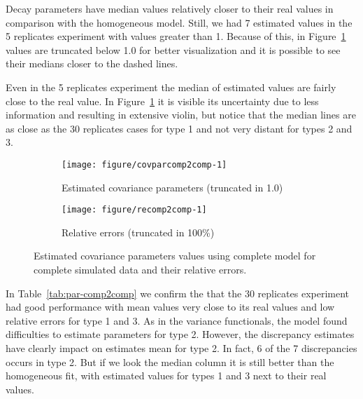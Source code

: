 Decay parameters have median values relatively closer to their real values in comparison with the homogeneous model. Still, we had 7 estimated values in the 5 replicates experiment with values greater than 1. Because of this, in Figure~\ref{fig:cpest-comp2comp} values are truncated below 1.0 for better visualization and it is possible to see their medians closer to the dashed lines.

Even in the 5 replicates experiment the median of estimated values are fairly close to the real value. In Figure~\ref{fig:cpest-comp2comp} it is visible its  uncertainty due to less information and resulting in extensive violin, but notice that the median lines are as close as the 30 replicates cases for type 1 and not very distant for types 2 and 3.


\begin{figure}[t]
  \begin{subfigure}{\textwidth}
  \centering
\begin{knitrout}
\color{fgcolor}
\texttt{[image: figure/covparcomp2comp-1]} 

\end{knitrout}
    \caption{Estimated covariance parameters (truncated in 1.0)} \label{fig:cpest-comp2comp}
 \end{subfigure}
 \begin{subfigure}{\textwidth}
  \centering
\begin{knitrout}
\color{fgcolor}
\texttt{[image: figure/recomp2comp-1]} 

\end{knitrout}
   \caption{Relative errors (truncated in 100\%) }\label{fig:re-comp2comp}
 \end{subfigure}
 \caption{Estimated covariance parameters values using complete model for complete simulated data and their relative errors.}
  \label{fig:cp-comp2comp}
\end{figure}  


In Table~\ref{tab:par-comp2comp} we confirm the that the 30 replicates experiment had good performance with mean values very close to its real values and low relative errors for type 1 and 3. As in the variance functionals, the model found difficulties to estimate parameters for type 2. However, the discrepancy estimates have clearly impact on estimates mean for type 2. In fact, 6 of the 7 discrepancies occurs in type 2. But if we look the median column it is still better than the homogeneous fit, with estimated values for types 1 and 3 next to their real values.

